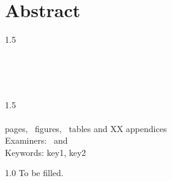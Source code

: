 \section*{Abstract}
\begin{spacing}{1.5}
\university\\
\school\\
\degreeprogramme\\
\end{spacing}

\myname

\textbf{\mytitle}\\
\mysubtitle

\begin{spacing}{1.5}
\thesistype\\
\thesisyear\\
\pageref{myLastPage} pages, \totalfigures~figures, \totaltables~tables and XX appendices\\
Examiners: \examinerA~and \examinerB\\
Keywords: key1, key2
\end{spacing}

\vspace{1em}
\begin{spacing}{1.0}
To be filled.
\end{spacing}
\clearpage %
